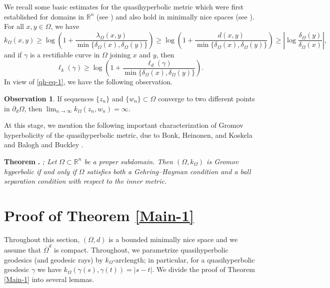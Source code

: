\documentclass[a4paper,12pt]{amsart}
\theoremstyle{definition}
\newtheorem{observation}{Observation}
\newcounter{alphabet}
\newenvironment{Thm}[1][]{\refstepcounter{alphabet}%
	\bigskip%
	\noindent%
	{\bf Theorem \Alph{alphabet}}%
	\ifthenelse{\equal{#1}{}}{}{ (#1)}%
	{\bf .} \itshape}{\vskip 8pt}
\begin{document}
We recall some basic estimates for the quasihyperbolic metric which were first established for domains in $\mathbb{R}^n$ (see \cite[Lemma 2.1]{Gehring-1976}) and also hold in minimally nice spaces (see \cite[Chapter 2]{BHK}). For all $x,y\in \Omega$, we have
\begin{equation}\label{qh-eq-1}
	k_{\Omega}(x,y)\ge \log\left(1+\frac{\lambda_{\Omega}(x,y)}{\min\{\delta_{\Omega}(x),\delta_{\Omega}(y)\}}\right)\ge \log\left(1+\frac{d(x,y)}{\min\{\delta_{\Omega}(x),\delta_{\Omega}(y)\}}\right)\ge \left|\log \frac{\delta_{\Omega}(y)}{\delta_{\Omega}(x)}\right|,
\end{equation}
and if $\gamma$ is a rectifiable curve in $\Omega$ joining $x$ and $y$, then
\begin{equation}\label{qh-eq-2}
	\ell_k(\gamma)\ge \log\left(1+\frac{\ell_d(\gamma)}{\min\{\delta_{\Omega}(x),\delta_{\Omega}(y)\}}\right).
\end{equation}
In view of \eqref{qh-eq-1}, we have the following observation.
\begin{observation}\label{observation}
	If sequences $\{z_n\}$ and $\{w_n\} \subset \Omega$ converge to two different points in $\partial_d\Omega$, then $\lim_{n\to \infty}k_{\Omega}(z_n,w_n)=\infty$.
\end{observation}

At this stage, we mention the following important characterization of Gromov hyperbolicity of the quasihyperbolic metric, due to Bonk, Heinonen, and Koskela \cite[Propositions 7.12 and 7.14]{BHK} and Balogh and Buckley \cite[Theorem 0.1]{Balogh-2002}.

\begin{Thm}\cite[Propositions 7.12 and 7.14]{BHK}; \cite[Theorem 0.1]{Balogh-2002}
	Let $\Omega \subset \mathbb{R}^n$ be a proper subdomain. Then $(\Omega,k_{\Omega})$ is Gromov hyperbolic if and only if $\Omega$ satisfies both a Gehring--Hayman condition and a ball separation condition with respect to the inner metric.
\end{Thm}


\section{Proof of Theorem \ref{Main-1}}
Throughout this section, $(\Omega,d)$ is a bounded minimally nice space and we assume that $\overline{\Omega}^d$ is compact.
Throughout, we parametrize quasihyperbolic geodesics (and geodesic rays) by
$k_\Omega$-arclength; in particular, for a quasihyperbolic geodesic $\gamma$ we have
$k_\Omega(\gamma(s),\gamma(t)) = |s-t|$. We divide the proof of Theorem \ref{Main-1} into several lemmas.
\end{document}
